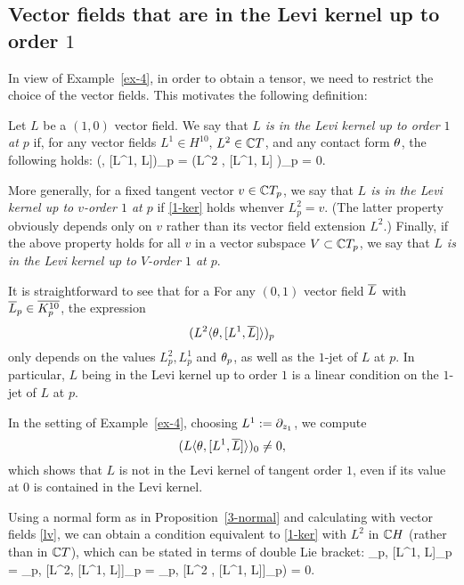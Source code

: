\documentclass[12pt]{amsart}
\begin{document}
\subsection{Vector fields that are in the Levi kernel up to order $1$}
In view of Example~\ref{ex-4},
in order to obtain a tensor, we need to restrict
the choice of the vector fields.
This motivates the following definition:

\bd{}
Let $L$ be a $(1,0)$ vector field.
We say that 
{\em $L$ is in the Levi kernel up to
order $1$ at $p$} if,
for any vector fields $L^1\in H^{10}$, $L^2\in {\mathbb{C}} T$,
and any contact form $\theta$, the following holds:
\beq{}
	(\la \th, [L^1, \1L]\ra )_p
	= (L^2 \la \th, [L^1, \1L] \ra)_p 
	= 0.
\eeq

More generally, 
for a fixed tangent vector $v\in {\mathbb{C}} T_p$,
we say that
{\em $L$ is in the Levi kernel up to 
$v$-order $1$ at $p$} 
if \eqref{1-ker}
holds whenver $L^2_p=v$. 
(The latter property obviously depends only on $v$
rather than its vector field extension $L^2$.)
Finally, if the above property holds for all $v$
in a vector subspace $V\subset {\mathbb{C}} T_p$,
we say that
{\em $L$ is in the Levi kernel up to 
$V$-order $1$ at $p$}.
\ed



It is straightforward to see that for a
\bl{}
For any $(0,1)$ vector field $\overline{L}$
with $\overline{L}_p\in \overline{K^{10}_p}$, 
the expression
$$ 
	(L^2 \langle \theta, [L^1, \overline{L}] \rangle)_p 
$$
only depends on the values $L^2_p, L^1_p$ and $\theta_p$,
as well as the $1$-jet of $L$ at $p$.
In particular,  $L$ being in the Levi kernel up to order $1$
is a linear condition on the $1$-jet of $L$ at $p$.
\el

\be
In the setting of Example~\ref{ex-4},
choosing $L^1:= \partial_{z_1}$, we compute
$$
	(L \langle \theta, [L^1, \overline{L}] \rangle )_0 \ne 0,
$$
which shows that $L$ is not in the Levi kernel of tangent order $1$,
even if its value at $0$ is contained in the Levi kernel.
\ee


\br{}
Using a normal form as in Proposition~\ref{3-normal} 
and calculating with vector fields \eqref{lv},
we can obtain a condition equivalent to
 \eqref{1-ker}
with $L^2$ in ${\mathbb{C}} H$ (rather than in ${\mathbb{C}} T$), which can be 
stated in terms of double Lie bracket:
\beq{}
	\la \th_p, [L^1, \1L]_p\ra
	= \la \th_p, [L^2, [L^1, \1L]]_p \ra 
	= \la \th_p, [\1L^2 , [L^1, \1L]]_p\ra)
	= 0.
\eeq
\er
\end{document}
